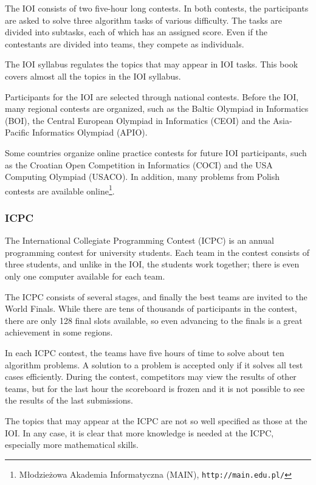 The IOI consists of two five-hour long contests.
In both contests, the participants are asked to
solve three algorithm tasks of various difficulty.
The tasks are divided into subtasks,
each of which has an assigned score.
Even if the contestants are divided into teams,
they compete as individuals.

The IOI syllabus \cite{iois} regulates the topics
that may appear in IOI tasks.
This book covers almost all the topics in the IOI syllabus.

Participants for the IOI are selected through
national contests.
Before the IOI, many regional contests are organized,
such as the Baltic Olympiad in Informatics (BOI),
the Central European Olympiad in Informatics (CEOI)
and the Asia-Pacific Informatics Olympiad (APIO).

Some countries organize online practice contests
for future IOI participants,
such as the Croatian Open Competition in Informatics (COCI)
and the USA Computing Olympiad (USACO).
In addition,
many problems from Polish contests
are available online\footnote{Młodzieżowa Akademia Informatyczna (MAIN), \texttt{http://main.edu.pl/}}.

\subsubsection{ICPC}

The International Collegiate Programming Contest (ICPC)
is an annual programming contest for university students.
Each team in the contest consists of three students,
and unlike in the IOI, the students work together;
there is even only one computer available for each team.

The ICPC consists of several stages, and finally the
best teams are invited to the World Finals.
While there are tens of thousands of participants
in the contest, there are only 128 final slots available,
so even advancing to the finals
is a great achievement in some regions.

In each ICPC contest, the teams have five hours of time to
solve about ten algorithm problems.
A solution to a problem is accepted only if it solves
all test cases efficiently.
During the contest, competitors may view the results of other teams,
but for the last hour the scoreboard is frozen and it
is not possible to see the results of the last submissions.

The topics that may appear at the ICPC are not so well
specified as those at the IOI.
In any case, it is clear that more knowledge is needed
at the ICPC, especially more mathematical skills.

